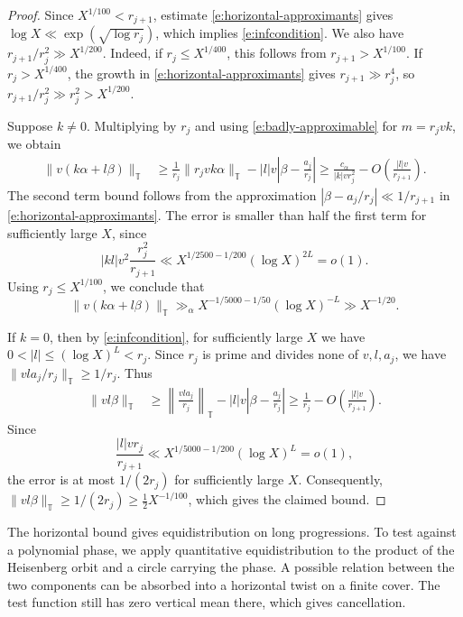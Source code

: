 \documentclass[12pt]{amsart}
\newcommand{\1}{\mathbf 1}
\theoremstyle{definition}
\begin{document}
\begin{proof}
Since \(X^{1/100}<r_{j+1}\), estimate \eqref{e:horizontal-approximants}
gives \(\log X\ll\exp(\sqrt{\log r_j})\), which implies  \eqref{e:infcondition}.
We also have $r_{j+1}/{r_j^2}\gg X^{1/200}.$
Indeed, if \(r_j\leq X^{1/400}\), this follows from
\(r_{j+1}>X^{1/100}\). If \(r_j>X^{1/400}\), the growth in
\eqref{e:horizontal-approximants} gives \(r_{j+1}\gg r_j^4\),
so \(r_{j+1}/r_j^2\gg r_j^2>X^{1/200}\).

Suppose \(k\ne0\). Multiplying by \(r_j\) and using
\eqref{e:badly-approximable} for $m=r_j v k$, we obtain
\[
\begin{aligned}
 \|v(k\alpha+l\beta)\|_{\mathbb T}
 &\geq \frac1{r_j}\|r_jvk\alpha\|_{\mathbb T}
       -|l|v\left|\beta-\frac{a_j}{r_j}\right|\geq \frac{c_\alpha}{|k|v r_j^2}
       -O\left(\frac{|l|v}{r_{j+1}}\right).
\end{aligned}
\]
The second term bound follows from the approximation
\(\left|\beta-a_j/r_j\right|\ll 1/r_{j+1}\) in
\eqref{e:horizontal-approximants}. The error is smaller than half the first term for sufficiently
large \(X\), since
\[
 |kl|v^2\frac{r_j^2}{r_{j+1}}
 \ll X^{1/2500-1/200}(\log X)^{2L}=o(1).
\]
Using \(r_j\leq X^{1/100}\), we conclude that
\[
 \|v(k\alpha+l\beta)\|_{\mathbb T}
 \gg_\alpha X^{-1/5000-1/50}(\log X)^{-L}
 \gg X^{-1/20}.
\]

If \(k=0\), then by \eqref{e:infcondition}, for sufficiently large
\(X\) we have \(0<|l|\leq(\log X)^L<r_j\). Since \(r_j\) is prime
and divides none of \(v,l,a_j\), we have
\(\|vla_j/r_j\|_{\mathbb T}\geq 1/r_j\). Thus
\[
\begin{aligned}
 \|vl\beta\|_{\mathbb T}
 &\geq \left\|\frac{vla_j}{r_j}\right\|_{\mathbb T}
       -|l|v\left|\beta-\frac{a_j}{r_j}\right|\geq \frac1{r_j}-O\left(\frac{|l|v}{r_{j+1}}\right).
\end{aligned}
\]
Since
\[
 \frac{|l|v r_j}{r_{j+1}}
 \ll X^{1/5000-1/200}(\log X)^L=o(1),
\]
the error is at most \(1/(2r_j)\) for sufficiently large \(X\).
Consequently, \(\|vl\beta\|_{\mathbb T}\geq 1/(2r_j)
\geq \tfrac12 X^{-1/100}\), which gives the claimed bound.
\end{proof}

The horizontal bound gives equidistribution on long progressions.
To test against a polynomial phase, we apply quantitative
equidistribution to the product of the Heisenberg orbit and a circle
carrying the phase. A possible relation between the two components
can be absorbed into a horizontal twist on a finite cover. The test
function still has zero vertical mean there, which gives cancellation.
\end{document}
